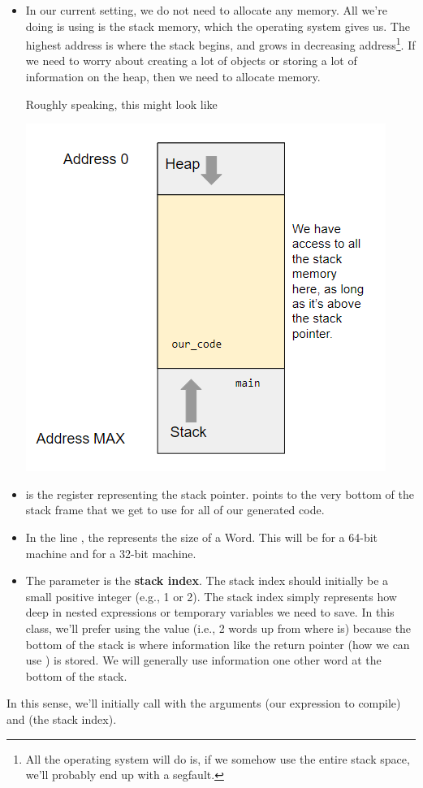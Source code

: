\documentclass[letterpaper]{article}
\begin{document}
\begin{itemize}
    \item In our current setting, we do not need to allocate any memory. All we're doing is using is the stack memory, which the operating system gives us. The highest address is where the stack begins, and grows in decreasing address\footnote{All the operating system will do is, if we somehow use the entire stack space, we'll probably end up with a segfault.}. If we need to worry about creating a lot of objects or storing a lot of information on the heap, then we need to allocate memory. 
    
    \bigskip 

    Roughly speaking, this might look like 
    \begin{center}
        \includegraphics[scale=0.9]{../assets/stack_vis.png}
    \end{center}
    \item {} is the register representing the stack pointer.  points to the very bottom of the stack frame that we get to use for all of our generated code. 
    \item In the line , the  represents the size of a Word. This will be  for a 64-bit machine and  for a 32-bit machine. 
    \item The  parameter is the \textbf{stack index}. The stack index should initially be a small positive integer (e.g., 1 or 2). The stack index simply represents how deep in nested expressions or temporary variables we need to save. In this class, we'll prefer using the value  (i.e., 2 words up from where  is) because the bottom of the stack is where information like the return pointer (how we can use ) is stored. We will generally use information one other word at the bottom of the stack.
\end{itemize}
In this sense, we'll initially call  with the arguments  (our expression to compile) and  (the stack index).
\end{document}
